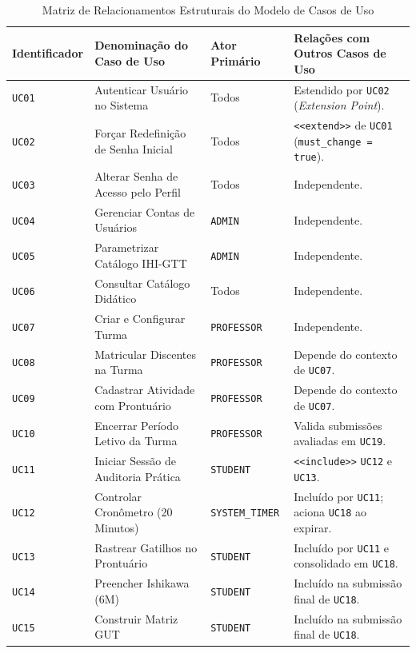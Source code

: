 \begin{table}[!ht]
\centering
\caption{Matriz de Relacionamentos Estruturais do Modelo de Casos de Uso}
\label{tab_relacoes_estruturais_uc}
\footnotesize
\begin{tabularx}{\textwidth}{p{2.2cm} p{4.2cm} p{2.2cm} X}
\toprule
\textbf{Identificador} & \textbf{Denominação do Caso de Uso} & \textbf{Ator Primário} & \textbf{Relações com Outros Casos de Uso} \\
\midrule
\texttt{UC01} & Autenticar Usuário no Sistema & Todos & Estendido por \texttt{UC02} (\textit{Extension Point}). \\
\texttt{UC02} & Forçar Redefinição de Senha Inicial & Todos & \texttt{<<extend>>} de \texttt{UC01} (\texttt{must\_change = true}). \\
\texttt{UC03} & Alterar Senha de Acesso pelo Perfil & Todos & Independente. \\
\texttt{UC04} & Gerenciar Contas de Usuários & \texttt{ADMIN} & Independente. \\
\texttt{UC05} & Parametrizar Catálogo IHI-GTT & \texttt{ADMIN} & Independente. \\
\texttt{UC06} & Consultar Catálogo Didático & Todos & Independente. \\
\texttt{UC07} & Criar e Configurar Turma & \texttt{PROFESSOR} & Independente. \\
\texttt{UC08} & Matricular Discentes na Turma & \texttt{PROFESSOR} & Depende do contexto de \texttt{UC07}. \\
\texttt{UC09} & Cadastrar Atividade com Prontuário & \texttt{PROFESSOR} & Depende do contexto de \texttt{UC07}. \\
\texttt{UC10} & Encerrar Período Letivo da Turma & \texttt{PROFESSOR} & Valida submissões avaliadas em \texttt{UC19}. \\
\texttt{UC11} & Iniciar Sessão de Auditoria Prática & \texttt{STUDENT} & \texttt{<<include>>} \texttt{UC12} e \texttt{UC13}. \\
\texttt{UC12} & Controlar Cronômetro (20 Minutos) & \texttt{SYSTEM\_TIMER} & Incluído por \texttt{UC11}; aciona \texttt{UC18} ao expirar. \\
\texttt{UC13} & Rastrear Gatilhos no Prontuário & \texttt{STUDENT} & Incluído por \texttt{UC11} e consolidado em \texttt{UC18}. \\
\texttt{UC14} & Preencher Ishikawa (6M) & \texttt{STUDENT} & Incluído na submissão final de \texttt{UC18}. \\
\texttt{UC15} & Construir Matriz GUT & \texttt{STUDENT} & Incluído na submissão final de \texttt{UC18}. \\

\end{tabularx}
\end{table}
